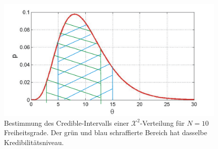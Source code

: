 \begin{figure}[!htb]
	\begin{center}
		\includegraphics[width=120mm]
		{12_vorlesung_GUMS2/media/Posterior_Vertrauensintervall_Chi2_all.png}
		\caption{
			Bestimmung des Credible-Intervalls einer $\mathcal{X}^2$-Verteilung für
		$N=10$ Freiheitsgrade. Der grün und blau schraffierte Bereich hat
	dasselbe Kredibilitätsniveau.}
     \label{fig:Beispiel_Bestimmung_CredibleIntervall_nichtsymmetrisch}
	\end{center}
\end{figure}
